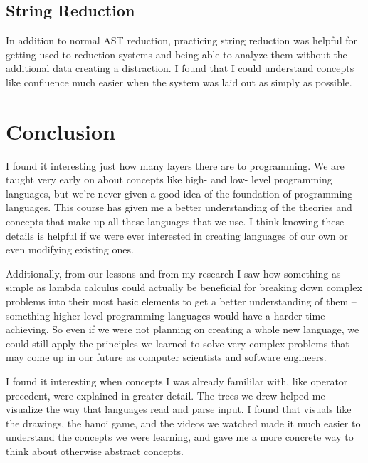 \documentclass{article}
\theoremstyle{theorem}
\theoremstyle{definition}
\theoremstyle{remark}
\begin{document}
\subsection{String Reduction}
In addition to normal AST reduction, practicing string reduction was helpful for getting used to reduction systems and being able to analyze them without the additional data creating a distraction. I found that I could understand concepts like 
confluence much easier when the system was laid out as simply as possible.

\section{Conclusion}\label{conclusion}

I found it interesting just how many layers there are to programming. We are taught very early on about concepts like high- and low- level programming languages, but we're never given
a good idea of the foundation of programming languages. This course has given me a better understanding of the theories and concepts that make up all these languages that we use. I think
knowing these details is helpful if we were ever interested in creating languages of our own or even modifying existing ones. 

\hspace{0.65cm}Additionally, from our lessons and from my research I saw how something
as simple as lambda calculus could actually be beneficial for breaking down complex problems into their most basic elements to get a better understanding of them -- something higher-level programming languages would have a harder time achieving.
So even if we were not planning on creating a whole new language, we could still apply the principles we learned to solve very complex problems that may come up in our future as computer scientists and
software engineers.

\hspace{0.65cm}I found it interesting when concepts I was already famililar with, like operator precedent, were explained in greater detail. The trees we drew helped me visualize the way that languages read and parse input. I found that visuals like the drawings, 
the hanoi game, and the videos we watched made it much easier to understand the concepts we were learning, and gave me a more concrete way to think about otherwise abstract concepts. 
\end{document}
